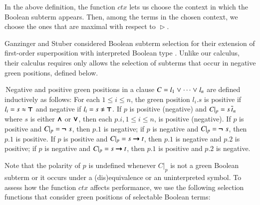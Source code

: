 In the above definition, the function $\mathit{ctx}$ lets
us choose the context in which the Boolean subterm appears. Then, among
the terms in the chosen context, we choose the ones that are maximal with
respect to $\vartriangleright$.

Ganzinger and Stuber considered Boolean subterm selection for their extension of
first-order superposition with interpreted Boolean type \cite{gs-05-boolsup}. Unlike our calculus, their calculus requires
only allows the selection of subterms that occur in negative green positions, defined below.

\begin{defi}
 \,Negative and positive green positions in a clause $C = l_1 \mathrel\lor \cdots \mathrel\lor
 l_n$ are defined inductively as follows: For each
 $1 \leq i \leq n$, the green position $l_i.s$ is positive if $l_i = s \approx \pmb{\top}$ and negative if $l_i
 = \neglit{s}$. If $p$ is positive (negative) and $C|_p = s \,
 \overline{t}_{n}$ where $s$ is either $\pmb{\land}$ or $\pmb{\lor}$, then each
 $p.i, 1 \leq i \leq n$, is positive (negative). If $p$ is positive and $C|_p =
 \pmb{\neg\,} \, s$, then $p.1$ is negative; if $p$ is negative and $C|_p = \pmb{\neg\,} \, s$,
 then $p.1$ is positive. If $p$ is positive and $C|_p = s \pmb{\rightarrow} t$, then
 $p.1$ is negative and $p.2$ is positive; if $p$ is negative and $C|_p = s
 \pmb{\rightarrow} t$, then $p.1$ is positive and $p.2$ is negative.
\end{defi}
Note that the polarity of $p$ is undefined whenever $C|_p$ is not a green Boolean subterm
or it occurs under a (dis)equivalence or an uninterpreted symbol.
To assess how the function $\mathit{ctx}$ affects performance, we use the following
selection functions that consider green positions of selectable Boolean terms:
%

